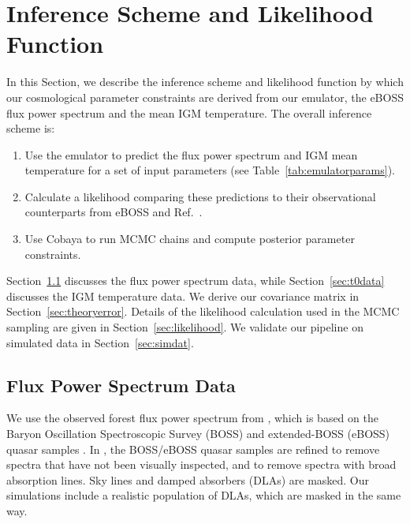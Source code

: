 \section{Inference Scheme and Likelihood Function}\label{sec:inference}

In this Section, we describe the inference scheme and likelihood function by which our cosmological parameter constraints are derived from our emulator, the eBOSS flux power spectrum \cite{2019JCAP...07..017C} and the mean IGM temperature.
The overall inference scheme is:
\begin{enumerate}
    \item Use the emulator to predict the flux power spectrum and IGM mean temperature for a set of input parameters (see Table~\ref{tab:emulatorparams}).
    \item Calculate a likelihood comparing these predictions to their observational counterparts from eBOSS \cite{2019JCAP...07..017C} and Ref.~\cite{2021MNRAS.506.4389G}.
    \item Use Cobaya \cite{2021JCAP...05..057T, 2019ascl.soft10019T} to run MCMC chains and compute posterior parameter constraints.
\end{enumerate}
Section~\ref{sec:fpsdata} discusses the flux power spectrum data, while Section~\ref{sec:t0data} discusses the IGM temperature data.
We derive our covariance matrix in Section~\ref{sec:theoryerror}.
Details of the likelihood calculation used in the MCMC sampling are given in Section~\ref{sec:likelihood}.
We validate our pipeline on simulated data in Section~\ref{sec:simdat}.


\subsection{Flux Power Spectrum Data}
\label{sec:fpsdata}

We use the observed \lya forest flux power spectrum from \cite{2019JCAP...07..017C}, which is based on the Baryon Oscillation Spectroscopic Survey (BOSS) and extended-BOSS (eBOSS) quasar samples \cite{2013AJ....145...10D, 2016AJ....151...44D}.
In \cite{2019JCAP...07..017C}, the BOSS/eBOSS quasar samples are refined to remove spectra that have not been visually inspected, and to remove spectra with broad absorption lines.
Sky lines and damped \lya absorbers (DLAs) are masked.
Our simulations include a realistic population of DLAs, which are masked in the same way.

